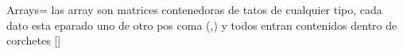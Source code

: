 Arrays= las array son matrices contenedoras de tatos de cualquier tipo, cada dato esta eparado uno de otro pos coma (,) y todos entran contenidos dentro de corchetes []